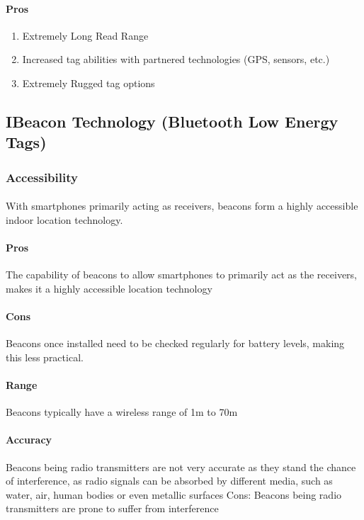 \documentclass[12pt,a4paper]{article}
\begin{document}
\begin{appendices}
      \paragraph{Pros}
        \begin{enumerate}
          \item Extremely Long Read Range
          \item Increased tag abilities with partnered technologies (GPS, sensors, etc.)
          \item Extremely Rugged tag options
        \end{enumerate}
  
    \subsection{IBeacon Technology (Bluetooth Low Energy Tags)}
      \subsubsection{Accessibility}
        \paragraph{}    
          With smartphones primarily acting as receivers, beacons form a highly accessible indoor location technology.
          \paragraph{Pros}    
          The capability of beacons to allow smartphones to primarily act as the receivers, makes it a highly accessible location technology
          \paragraph{Cons}    
          Beacons once installed need to be checked regularly for battery levels, making this less practical.
          \paragraph{Range}
          Beacons typically have a wireless range of 1m to 70m
          \paragraph{Accuracy}
          Beacons being radio transmitters are not very accurate as they stand the chance of interference, as radio signals can be absorbed by different media, such as water, air, human bodies or even metallic surfaces Cons: Beacons being radio transmitters are prone to suffer from interference

\end{appendices}
\end{document}
